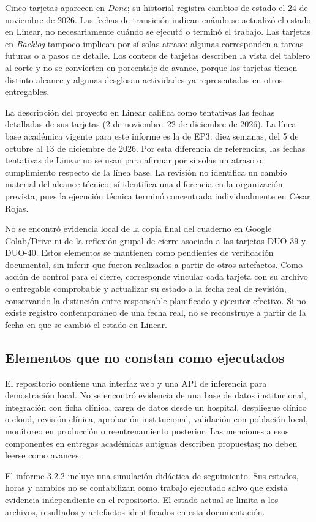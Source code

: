 Cinco tarjetas aparecen en \textit{Done}; su historial registra cambios de estado el 24 de noviembre de 2026. Las fechas de transición indican cuándo se actualizó el estado en Linear, no necesariamente cuándo se ejecutó o terminó el trabajo. Las tarjetas en \textit{Backlog} tampoco implican por sí solas atraso: algunas corresponden a tareas futuras o a pasos de detalle. Los conteos de tarjetas describen la vista del tablero al corte y no se convierten en porcentaje de avance, porque las tarjetas tienen distinto alcance y algunas desglosan actividades ya representadas en otros entregables.

La descripción del proyecto en Linear califica como tentativas las fechas detalladas de sus tarjetas (2 de noviembre–22 de diciembre de 2026). La línea base académica vigente para este informe es la de EP3: diez semanas, del 5 de octubre al 13 de diciembre de 2026. Por esta diferencia de referencias, las fechas tentativas de Linear no se usan para afirmar por sí solas un atraso o cumplimiento respecto de la línea base. La revisión no identifica un cambio material del alcance técnico; sí identifica una diferencia en la organización prevista, pues la ejecución técnica terminó concentrada individualmente en César Rojas.

No se encontró evidencia local de la copia final del cuaderno en Google Colab/Drive ni de la reflexión grupal de cierre asociada a las tarjetas DUO-39 y DUO-40. Estos elementos se mantienen como pendientes de verificación documental, sin inferir que fueron realizados a partir de otros artefactos. Como acción de control para el cierre, corresponde vincular cada tarjeta con su archivo o entregable comprobable y actualizar su estado a la fecha real de revisión, conservando la distinción entre responsable planificado y ejecutor efectivo. Si no existe registro contemporáneo de una fecha real, no se reconstruye a partir de la fecha en que se cambió el estado en Linear.

\subsection{Elementos que no constan como ejecutados}

El repositorio contiene una interfaz web y una API de inferencia para demostración local. No se encontró evidencia de una base de datos institucional, integración con ficha clínica, carga de datos desde un hospital, despliegue clínico o cloud, revisión clínica, aprobación institucional, validación con población local, monitoreo en producción o reentrenamiento posterior. Las menciones a esos componentes en entregas académicas antiguas describen propuestas; no deben leerse como avances.

El informe 3.2.2 incluye una simulación didáctica de seguimiento. Sus estados, horas y cambios no se contabilizan como trabajo ejecutado salvo que exista evidencia independiente en el repositorio. El estado actual se limita a los archivos, resultados y artefactos identificados en esta documentación.
